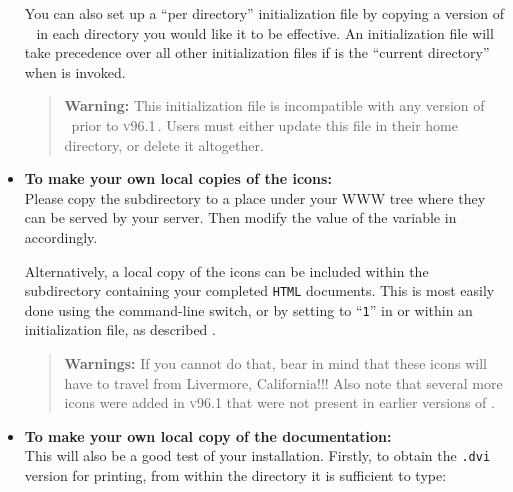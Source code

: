 \begin{itemize}
%

You can also set up a ``per directory'' initialization file by
copying a version of \  in each directory you
would like it to be effective. An initialization file
 will take precedence over all other
initialization files if  is the ``current directory'' when
\latextohtml{} is invoked.

%
\begin{quotation}\noindent
\textbf{Warning: }%
This initialization file is incompatible with
any version of \latextohtml\ prior to \textsc{v96.1}\,.
Users must either update this file in their home directory,
or delete it altogether.
\end{quotation}

%
\item \label{icondir}%
\textbf{To make your own local copies of the \latextohtml{} icons:} \\
Please copy the  subdirectory to a
place under your WWW tree
where they can be served by your server.
Then modify the value of the  variable in
 accordingly.
%
\begin{changebar}%
Alternatively, a local copy of the icons can be included within
the subdirectory containing your completed \texttt{HTML} documents.
This is most easily done using the  command-line switch,
or by setting  to ``\texttt{1}'' in 
or within an initialization file, as described .
\end{changebar}

%
\begin{quotation}\noindent
\textbf{Warnings: }%
If you cannot do that, bear in mind that these icons will have
to travel from Livermore, California!!!
Also note that several more icons were added in \textsc{v96.1}
that were not present in earlier versions of \latextohtml.
\end{quotation}

%
%
\item
\textbf{To make your own local copy of the \latextohtml{}
documentation:} \\
This will also be a good test of your installation.
%
%
\noindent
Firstly, to obtain the \texttt{.dvi} version for printing,
from within the  directory it is sufficient to type:


\end{itemize}
